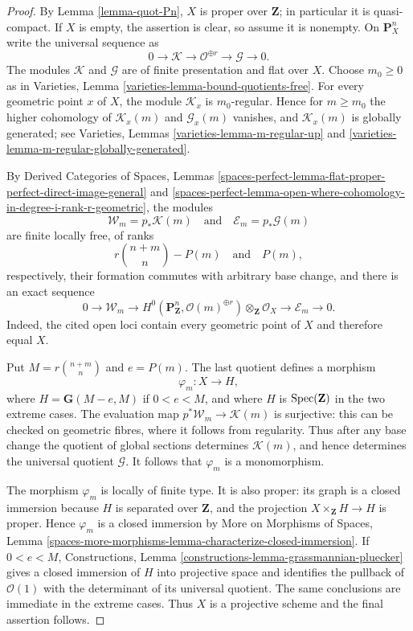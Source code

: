 \begin{proof}
By Lemma \ref{lemma-quot-Pn}, $X$ is proper over $\mathbf{Z}$; in
particular it is quasi-compact. If $X$ is empty, the assertion is clear,
so assume it is nonempty. On $\mathbf{P}^n_X$ write the universal
sequence as
$$
0 \longrightarrow \mathcal{K} \longrightarrow
\mathcal{O}^{\oplus r} \longrightarrow \mathcal{G}
\longrightarrow 0.
$$
The modules $\mathcal{K}$ and $\mathcal{G}$ are of finite presentation
and flat over $X$. Choose $m_0 \geq 0$ as in Varieties, Lemma
\ref{varieties-lemma-bound-quotients-free}. For every geometric point
$x$ of $X$, the module $\mathcal{K}_x$ is $m_0$-regular. Hence for
$m \geq m_0$ the higher cohomology of $\mathcal{K}_x(m)$ and
$\mathcal{G}_x(m)$ vanishes, and $\mathcal{K}_x(m)$ is globally
generated; see Varieties, Lemmas
\ref{varieties-lemma-m-regular-up} and
\ref{varieties-lemma-m-regular-globally-generated}.

By Derived Categories of Spaces, Lemmas
\ref{spaces-perfect-lemma-flat-proper-perfect-direct-image-general} and
\ref{spaces-perfect-lemma-open-where-cohomology-in-degree-i-rank-r-geometric},
the modules
$$
\mathcal{W}_m = p_*\mathcal{K}(m)
\quad\text{and}\quad
\mathcal{E}_m = p_*\mathcal{G}(m)
$$
are finite locally free, of ranks
$$
r{n + m \choose n} - P(m)\quad\text{and}\quad P(m),
$$
respectively, their formation commutes with arbitrary base change, and
there is an exact sequence
$$
0 \longrightarrow \mathcal{W}_m \longrightarrow
H^0(\mathbf{P}^n_\mathbf{Z},
\mathcal{O}(m)^{\oplus r}) \otimes_\mathbf{Z} \mathcal{O}_X
\longrightarrow \mathcal{E}_m \longrightarrow 0.
$$
Indeed, the cited open loci contain every geometric point of $X$ and
therefore equal $X$.

Put $M = r{n + m \choose n}$ and $e = P(m)$. The last quotient defines
a morphism
$$
\varphi_m : X \longrightarrow H,
$$
where $H = \mathbf{G}(M - e, M)$ if $0 < e < M$, and where $H$ is
$\mathop{\mathrm{Spec}}(\mathbf{Z})$ in the two extreme cases. The evaluation map
$p^*\mathcal{W}_m \to \mathcal{K}(m)$ is surjective: this can be checked
on geometric fibres, where it follows from regularity. Thus after any
base change the quotient of global sections determines
$\mathcal{K}(m)$, and hence determines the universal quotient
$\mathcal{G}$. It follows that $\varphi_m$ is a monomorphism.

The morphism $\varphi_m$ is locally of finite type. It is also proper:
its graph is a closed immersion because $H$ is separated over
$\mathbf{Z}$, and the projection $X \times_\mathbf{Z} H \to H$ is
proper. Hence $\varphi_m$ is a closed immersion by More on Morphisms of
Spaces, Lemma
\ref{spaces-more-morphisms-lemma-characterize-closed-immersion}.
If $0 < e < M$, Constructions, Lemma
\ref{constructions-lemma-grassmannian-pluecker} gives a closed immersion
of $H$ into projective space and identifies the pullback of
$\mathcal{O}(1)$ with the determinant of its universal quotient. The
same conclusions are immediate in the extreme cases. Thus $X$ is a
projective scheme and the final assertion follows.
\end{proof}

